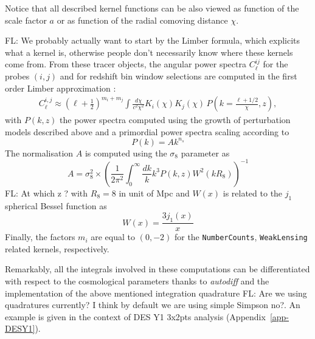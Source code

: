 \documentclass[twocolumn,twocolappendix,nofootinbib,iop]{openjournal}
\newcommand{\FrL}[1]{{\color{cyan}FL: #1}}
\newcommand{\JZ}[1]{{\color{purple}JZ: #1}}
\begin{document}
Notice that all described kernel functions can be also viewed as function of the scale factor $a$ or as function of the radial comoving distance $\chi$. 

\FrL{We probably actually want to start by the Limber formula, which explicits what a kernel is, otherwise people don't necessarily know where these kernels come from.}
From these tracer objects, the angular power spectra $C_\ell^{ij}$ for the probes $(i,j)$ and for redshift bin window selections are computed in the first order Limber approximation \citep{PhysRevD.78.123506}:
\begin{align}
    C_\ell^{i,j} \approx \left(\ell+\frac{1}{2}\right)^{m_i+m_j}\int\frac{d\chi}{c^2\chi^2}K_i(\chi)K_j(\chi)\,P\left(k=\frac{\ell+1/2}{\chi},z\right),\label{eq:Cell_limber}
\end{align}
with $P(k,z)$ the power spectra computed using the growth of perturbation models described above and a primordial power spectra scaling according to
\begin{equation}
    P(k) = A k^{n_s}
\end{equation}
The normalisation $A$ is computed using the $\sigma_8$ parameter as 
\begin{equation}
    A = \sigma_8^2 \times \left(\frac{1}{2 \pi^2} \int_0^\infty \frac{dk}{k} k^3 P(k,z) W^2(kR_8) \right)^{-1}
\end{equation}
\FrL{At which z ?}
with $R_8 = 8$ in unit of Mpc and $W(x)$ is related to the $j_1$ spherical Bessel function as
\begin{equation}
    W(x) = \frac{3j_1(x)}{x}
\end{equation}
Finally, the factors $m_i$ are equal to $(0,-2)$ for the \texttt{NumberCounts}, \texttt{WeakLensing} related kernels, respectively. 

Remarkably, all the integrals involved in these computations can be  differentiated with respect to the cosmological parameters thanks to \textit{autodiff} and the implementation of the above mentioned integration quadrature \FrL{Are we using quadratures currently? I think by default we are using simple Simpson no?}.  An example is given in the context of DES Y1 3x2pts analysis (Appendix~\ref{app-DESY1}).
%
\end{document}
